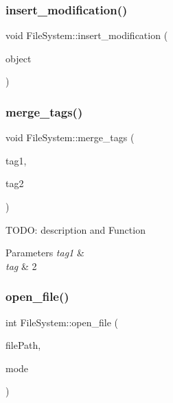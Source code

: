 \subsubsection{\texorpdfstring{insert\+\_\+modification()}{insert\_modification()}}
{\footnotesize\ttfamily void File\+System\+::insert\+\_\+modification (\begin{DoxyParamCaption}\item[{\mbox{\hyperlink{class_tree_object}{Tree\+Object}} $\ast$}]{object }\end{DoxyParamCaption})\hspace{0.3cm}{\ttfamily [private]}}

\mbox{\label{class_file_system_a639cbe0f8e5be5793cc20594c493a2c8}} 
\subsubsection{\texorpdfstring{merge\+\_\+tags()}{merge\_tags()}}
{\footnotesize\ttfamily void File\+System\+::merge\+\_\+tags (\begin{DoxyParamCaption}\item[{string}]{tag1,  }\item[{string}]{tag2 }\end{DoxyParamCaption})}

T\+O\+DO\+: description and Function 
\begin{DoxyParams}{Parameters}
{\em tag1} & \\
\hline
{\em tag} & 2 \\
\hline
\end{DoxyParams}
\mbox{\label{class_file_system_a661ae7deb6fb32cdd7d631dfadb8c983}} 
\subsubsection{\texorpdfstring{open\+\_\+file()}{open\_file()}}
{\footnotesize\ttfamily int File\+System\+::open\+\_\+file (\begin{DoxyParamCaption}\item[{vector$<$ string $>$ \&}]{file\+Path,  }\item[{char}]{mode }\end{DoxyParamCaption})}

